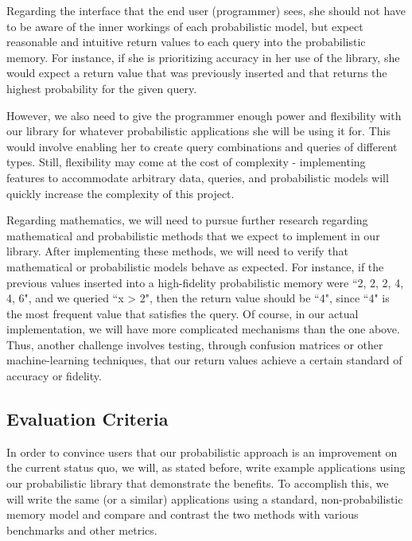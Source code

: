 \documentclass{sig-alternate}
\begin{document}
Regarding the interface that the end user (programmer) sees, she should not have to be aware of 
the inner workings of each probabilistic model, but expect reasonable and intuitive return values
to each query into the probabilistic memory. For instance, if she is prioritizing accuracy 
in her use of the library, she would expect a return value that was previously inserted and that 
returns the highest probability for the given query.

However, we also need to give the programmer enough power and flexibility with our library for 
whatever probabilistic applications she will be using it for. This would involve enabling 
her to create query combinations and queries of different types. Still, flexibility may 
come at the cost of complexity - implementing features to accommodate arbitrary data, queries,
and probabilistic models will quickly increase the complexity of this project. 

Regarding mathematics, we will need to pursue further research regarding mathematical 
and probabilistic methods that we expect to implement in our library. After implementing these methods,
we will need to verify that mathematical or probabilistic models behave as expected. 
For instance, if the previous values inserted into a high-fidelity probabilistic memory were ``2, 2, 2, 4, 4, 6", and we queried ``x > 2", 
then the return value should be ``4", since ``4" is the most frequent value that satisfies the query.
Of course, in our actual implementation, we will have more complicated mechanisms than the one above.
Thus, another challenge involves testing, through confusion matrices or other machine-learning techniques,
that our return values achieve a certain standard of accuracy or fidelity.


\subsection{Evaluation Criteria}
\label{subsec:eval_criteria}
In order to convince users that our probabilistic approach is an improvement on the
current status quo, we will, as stated before, write example applications using our 
probabilistic library that demonstrate the benefits. To accomplish 
this, we will write the same (or a similar) applications using a standard, non-probabilistic memory model
and compare and contrast the two methods with various benchmarks and other metrics.
\end{document}
